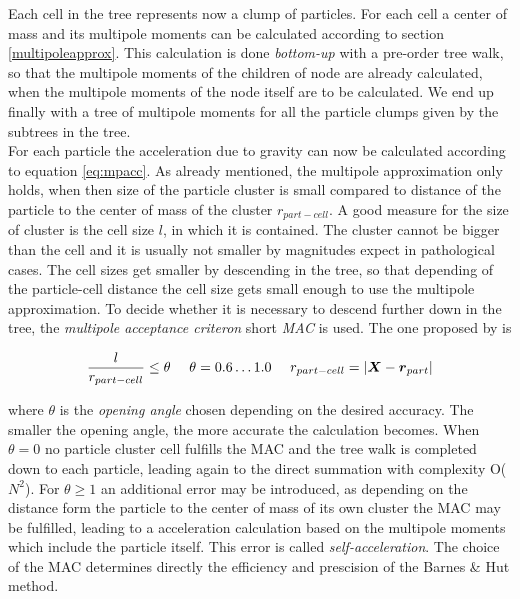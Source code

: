Each cell in the tree represents now a clump of particles. For each cell a center of mass and its multipole moments can be calculated according to section \ref{multipoleapprox}. This calculation is done \emph{bottom-up} with a pre-order tree walk, so that the multipole moments of the children of node are already calculated, when the multipole moments of the node itself are to be calculated. We end up finally with a tree of multipole moments for all the particle clumps given by the subtrees in the tree.\\

For each particle the acceleration due to gravity can now be calculated according to equation \ref{eq:mpacc}. As already mentioned, the multipole approximation only holds, when then size of the particle cluster is small compared to distance of the particle to the center of mass of the cluster $r_{part- cell}$. A good measure for the size of cluster is the cell size $l$, in which it is contained. The cluster cannot be bigger than the cell and it is usually not smaller by magnitudes expect in pathological cases. The cell sizes get smaller by descending in the tree, so that depending of the particle-cell distance the cell size gets small enough to use the multipole approximation. To decide whether it is necessary to descend further down in the tree, the \emph{multipole acceptance criteron} short \emph{MAC} is used. The one proposed by \cite{1986Natur.324..446B} is

\begin{equation}
\frac{l}{r_{part-cell}} \le \theta ~~~~ \theta = 0.6 \dots 1.0 ~~~~ r_{part-cell} = | \boldsymbol{X} - \boldsymbol{r}_{part}|
\end{equation}

where $\theta$ is the \emph{opening angle} chosen depending on the desired accuracy. The smaller the opening angle, the more accurate the calculation becomes. When $\theta = 0$ no particle cluster cell fulfills the MAC and the tree walk is completed down to each particle, leading again to the direct summation with complexity O($N^2$). For $\theta \ge 1$ an additional error may be introduced, as depending on the distance form the particle to the center of mass of its own cluster the MAC may be fulfilled, leading to a acceleration calculation based on the multipole moments which include the particle itself. This error is called \emph{self-acceleration}. The choice of the MAC determines directly the efficiency and prescision of the Barnes \& Hut method.

